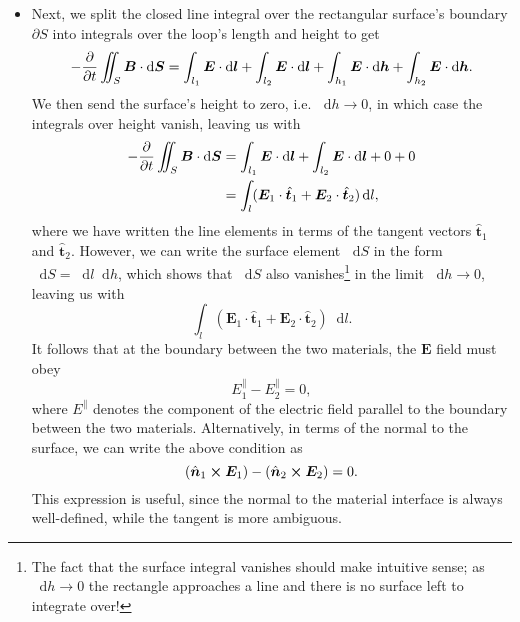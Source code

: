 \documentclass[11pt, a4paper]{article}
\newcommand{\diff}{\mathop{}\!\mathrm{d}} %
\renewcommand{\vec}[1]{\bm{#1}} %
\newcommand{\uvec}[1]{\hat{\vec{#1}}} %
\newcommand{\E}{\vec{E}} %
\newcommand{\B}{\vec{B}} %
\begin{document}
\begin{itemize}
    \item Next, we split the closed line integral over the rectangular surface's boundary $ \partial S $ into integrals over the loop's length and height to get
    \begin{equation*}
        - \pdv{t}\iint_{S}\B \cdot \diff \vec{S} = \int_{l_{1}}\E \cdot \diff \vec{l} + \int_{l_{2}}\E \cdot \diff \vec{l} + \int_{h_{1}}\E \cdot \diff \vec{h} + \int_{h_{2}}\E \cdot \diff \vec{h}.
    \end{equation*}
    We then send the surface's height to zero, i.e. $ \diff h \to 0 $, in which case the integrals over height vanish, leaving us with
    \begin{align*}
        - \pdv{t}\iint_{S}\B \cdot \diff \vec{S} &= \int_{l_{1}}\E \cdot \diff \vec{l} + \int_{l_{2}}\E \cdot \diff \vec{l} + 0 + 0\\
        & = \int_{l} (\E_{1}\cdot \uvec{t}_{1} + \E_{2}\cdot \uvec{t}_{2}) \diff l,
    \end{align*}
    where we have written the line elements in terms of the tangent vectors $ \uvec{t}_{1} $ and $ \uvec{t}_{2} $. However, we can write the surface element $ \diff S $ in the form $ \diff S = \diff l \diff h $, which shows that $ \diff S $ also vanishes\footnote{The fact that the surface integral vanishes should make intuitive sense; as $ \diff h \to 0 $ the rectangle approaches a line and there is no surface left to integrate over!} in the limit $ \diff h \to 0 $, leaving us with
    \begin{equation*}
        \int_{l} (\E_{1}\cdot \uvec{t}_{1} + \E_{2}\cdot \uvec{t}_{2}) \diff l.
    \end{equation*}
    It follows that at the boundary between the two materials, the $ \E $ field must obey
    \begin{equation*}
        E_{1}^{\parallel} - E_{2}^{\parallel} = 0,
    \end{equation*}
    where $ E^{\parallel} $ denotes the component of the electric field parallel to the boundary between the two materials. Alternatively, in terms of the normal to the surface, we can write the above condition as
	\begin{equation*}
		(\uvec{n}_{1} \cross \E_{1}) - (\uvec{n}_{2}\cross \E_{2}) = 0.
	\end{equation*}
	This expression is useful, since the normal to the material interface is always well-defined, while the tangent is more ambiguous.

\end{itemize}
\end{document}
